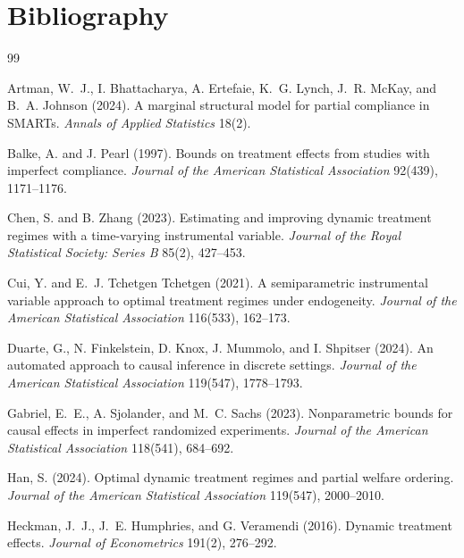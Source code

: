 \documentclass[11pt]{article}
\theoremstyle{definition}
\theoremstyle{plain}
\theoremstyle{remark}
\begin{document}
\section*{Bibliography}
\begin{thebibliography}{99}

Artman, W.~J., I. Bhattacharya, A. Ertefaie, K.~G. Lynch, J.~R. McKay, and B.~A. Johnson (2024).
\newblock A marginal structural model for partial compliance in SMARTs.
\newblock \emph{Annals of Applied Statistics} 18(2).

Balke, A. and J. Pearl (1997).
\newblock Bounds on treatment effects from studies with imperfect compliance.
\newblock \emph{Journal of the American Statistical Association} 92(439), 1171--1176.

Chen, S. and B. Zhang (2023).
\newblock Estimating and improving dynamic treatment regimes with a time-varying instrumental variable.
\newblock \emph{Journal of the Royal Statistical Society: Series B} 85(2), 427--453.

Cui, Y. and E.~J. Tchetgen Tchetgen (2021).
\newblock A semiparametric instrumental variable approach to optimal treatment regimes under endogeneity.
\newblock \emph{Journal of the American Statistical Association} 116(533), 162--173.

Duarte, G., N. Finkelstein, D. Knox, J. Mummolo, and I. Shpitser (2024).
\newblock An automated approach to causal inference in discrete settings.
\newblock \emph{Journal of the American Statistical Association} 119(547), 1778--1793.

Gabriel, E.~E., A. Sjolander, and M.~C. Sachs (2023).
\newblock Nonparametric bounds for causal effects in imperfect randomized experiments.
\newblock \emph{Journal of the American Statistical Association} 118(541), 684--692.

Han, S. (2024).
\newblock Optimal dynamic treatment regimes and partial welfare ordering.
\newblock \emph{Journal of the American Statistical Association} 119(547), 2000--2010.

Heckman, J.~J., J.~E. Humphries, and G. Veramendi (2016).
\newblock Dynamic treatment effects.
\newblock \emph{Journal of Econometrics} 191(2), 276--292.


\end{thebibliography}
\end{document}
